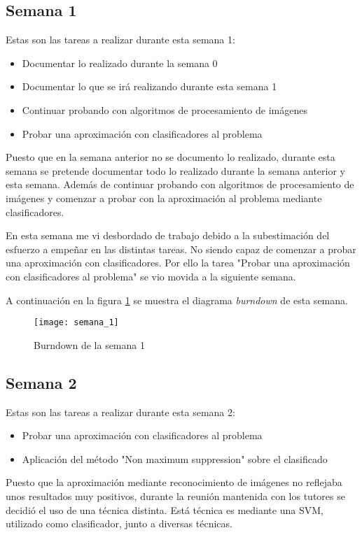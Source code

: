 \subsection{Semana 1}
Estas son las tareas a realizar durante esta semana 1:

\begin{itemize}
	\item Documentar lo realizado durante la semana 0
	\item Documentar lo que se irá realizando durante esta semana 1
	\item Continuar probando con algoritmos de procesamiento de imágenes
	\item Probar una aproximación con clasificadores al problema
\end{itemize}

Puesto que en la semana anterior no se documento lo realizado, durante esta semana se pretende documentar todo lo realizado durante la semana anterior y esta semana. Además de continuar probando con algoritmos de procesamiento de imágenes y comenzar a probar con la aproximación al problema mediante clasificadores.

En esta semana me vi desbordado de trabajo debido a la subestimación del esfuerzo a empeñar en las distintas tareas. No siendo capaz de comenzar a probar una aproximación con clasificadores. Por ello la tarea "Probar una aproximación con clasificadores al problema" se vio movida a la siguiente semana. 

A continuación en la figura \ref{fig:A.1.2} se muestra el diagrama \textit{burndown} de esta semana.

\begin{figure}[h]
\centering
\texttt{[image: semana\_1]}
\caption{Burndown de la semana 1}
\label{fig:A.1.2}
\end{figure}

\subsection{Semana 2}
Estas son las tareas a realizar durante esta semana 2:

\begin{itemize}
	\item Probar una aproximación con clasificadores al problema
	\item Aplicación del método "Non maximum suppression" sobre el clasificado
\end{itemize}

Puesto que la aproximación mediante reconocimiento de imágenes no reflejaba unos resultados muy positivos, durante la reunión mantenida con los tutores se decidió el uso de una técnica distinta. Está técnica es mediante una SVM, utilizado como clasificador, junto a diversas técnicas.

